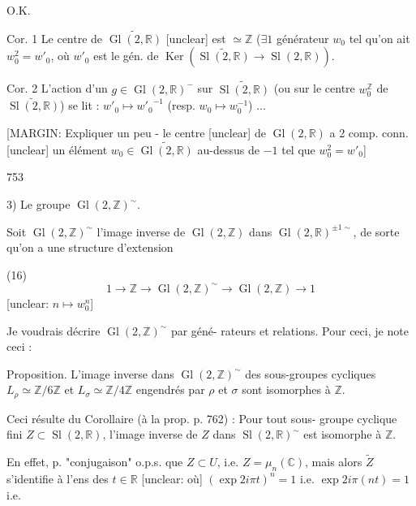 O.K.

Cor. 1 Le centre de $\widetilde{\operatorname{Gl}(2, \mathbb{R})}$ [unclear] est $\simeq \mathbb{Z}$ ($\exists 1$ générateur $w_0$ tel qu'on ait $w_0^2 = w'_0$, où $w'_0$ est le gén. de $\operatorname{Ker}(\widetilde{\operatorname{Sl}(2, \mathbb{R})} \to \operatorname{Sl}(2, \mathbb{R}))$.

Cor. 2 L'action d'un $g \in \operatorname{Gl}(2, \mathbb{R})^{-}$ sur $\widetilde{\operatorname{Sl}(2, \mathbb{R})}$ (ou sur le centre $w_0^\mathbb{Z}$ de $\widetilde{\operatorname{Sl}(2, \mathbb{R})}$) se lit : $w'_0 \mapsto {w'_0}^{-1}$ (resp. $w_0 \mapsto w_0^{-1}$) ...

[MARGIN: Expliquer un peu - le centre [unclear] de $\operatorname{Gl}(2, \mathbb{R})$ a 2 comp. conn. [unclear] un élément $w_0 \in \widetilde{\operatorname{Gl}(2, \mathbb{R})}$ au-dessus de $-1$ tel que $w_0^2 = w'_0$]

\newpage


753

3) Le groupe $\operatorname{Gl}(2, \mathbb{Z})^\sim$.

Soit $\operatorname{Gl}(2, \mathbb{Z})^\sim$ l'image inverse de $\operatorname{Gl}(2, \mathbb{Z})$
dans $\operatorname{Gl}(2, \mathbb{R})^{\pm 1 \sim}$, de sorte qu'on a une
structure d'extension

(16) $$1 \longrightarrow \mathbb{Z} \longrightarrow \operatorname{Gl}(2, \mathbb{Z})^\sim \longrightarrow \operatorname{Gl}(2, \mathbb{Z}) \longrightarrow 1$$
[unclear: $n \mapsto w_0^n$]

Je voudrais décrire $\operatorname{Gl}(2, \mathbb{Z})^\sim$ par géné-
rateurs et relations. Pour ceci, je
note ceci :

Proposition. L'image inverse dans $\operatorname{Gl}(2, \mathbb{Z})^\sim$ des sous-groupes
cycliques $L_\rho \simeq \mathbb{Z}/6\mathbb{Z}$ et $L_\sigma \simeq \mathbb{Z}/4\mathbb{Z}$
engendrés par $\rho$ et $\sigma$ sont isomorphes
à $\mathbb{Z}$.

Ceci résulte du
Corollaire (à la prop. p. 762) : Pour tout sous-
groupe cyclique fini $Z \subset \operatorname{Sl}(2, \mathbb{R})$, l'image
inverse de $Z$ dans $\operatorname{Sl}(2, \mathbb{R})^\sim$ est
isomorphe à $\mathbb{Z}$.

En effet, p. "conjugaison" o.p.s. que
$Z \subset U$, i.e. $Z = \mu_n(\mathbb{C})$, mais alors
$\tilde{Z}$ s'identifie à l'ens des $t \in \mathbb{R}$ [unclear: où]
$(\exp 2 i \pi t)^n = 1$ i.e. $\exp 2 i \pi (nt) = 1$ i.e.

